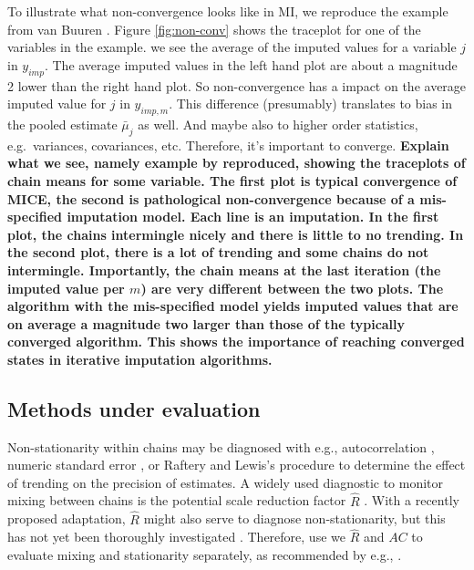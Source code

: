 \documentclass[Royal,times,sageh]{sagej}
\begin{document}
To illustrate what non-convergence looks like in MI, we reproduce the
example from van Buuren \citeyearpar[\(\S\) 6.5.2]{buur18}. Figure
\ref{fig:non-conv} shows the traceplot for one of the variables in the
example. we see the average of the imputed values for a variable \(j\)
in \(y_{imp}\). The average imputed values in the left hand plot are
about a magnitude 2 lower than the right hand plot. So non-convergence
has a impact on the average imputed value for \(j\) in \(y_{imp, m}\).
This difference (presumably) translates to bias in the pooled estimate
\(\bar{\mu}_j\) as well. And maybe also to higher order statistics,
e.g.~variances, covariances, etc. Therefore, it's important to converge.
\textbf{Explain what we see, namely example by \citet{buur18}
reproduced, showing the traceplots of chain means for some variable. The
first plot is typical convergence of MICE, the second is pathological
non-convergence because of a mis-specified imputation model. Each line
is an imputation. In the first plot, the chains intermingle nicely and
there is little to no trending. In the second plot, there is a lot of
trending and some chains do not intermingle. Importantly, the chain
means at the last iteration (the imputed value per \(m\)) are very
different between the two plots. The algorithm with the mis-specified
model yields imputed values that are on average a magnitude two larger
than those of the typically converged algorithm. This shows the
importance of reaching converged states in iterative imputation
algorithms.}

\hypertarget{methods-under-evaluation}{%
\subsection{Methods under evaluation}\label{methods-under-evaluation}}

Non-stationarity within chains may be diagnosed with e.g.,
autocorrelation \citep[\(AC\);][]{scha97, gelm13}, numeric standard
error \citep[`MC error';][]{gewe92}, or Raftery and Lewis's
\citeyearpar{raft91} procedure to determine the effect of trending on
the precision of estimates. A widely used diagnostic to monitor mixing
between chains is the potential scale reduction factor \(\widehat{R}\)
\citep[`Gelman-Rubin statistic';][]{gelm92}. With a recently proposed
adaptation, \(\widehat{R}\) might also serve to diagnose
non-stationarity, but this has not yet been thoroughly investigated
\citep{veht19}. Therefore, use we \(\widehat{R}\) and \(AC\) to evaluate
mixing and stationarity separately, as recommended by e.g.,
\citet{cowl96}.
\end{document}
